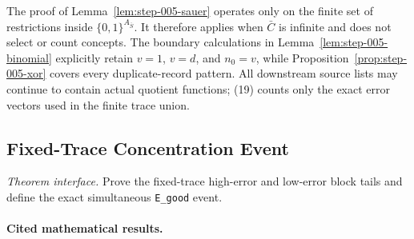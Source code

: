 The proof of Lemma~\ref{lem:step-005-sauer} operates only on the finite set
of restrictions inside \(\{0,1\}^{A_{\bar S}}\).  It therefore applies when
\(\bar C\) is infinite and does not select or count concepts.  The boundary
calculations in Lemma~\ref{lem:step-005-binomial} explicitly retain
\(v=1\), \(v=d\), and \(n_0=v\), while
Proposition~\ref{prop:step-005-xor} covers every duplicate-record pattern.
All downstream source lists may continue to contain actual quotient
functions; (19) counts only the exact error vectors used in the finite
trace union.



\subsection{Fixed-Trace Concentration Event}\label{app:step_006}

\noindent\textit{Theorem interface.} Prove the fixed-trace high-error and low-error block tails   and define the exact simultaneous \texttt{E\_good} event.

\paragraph{Cited mathematical results.}


